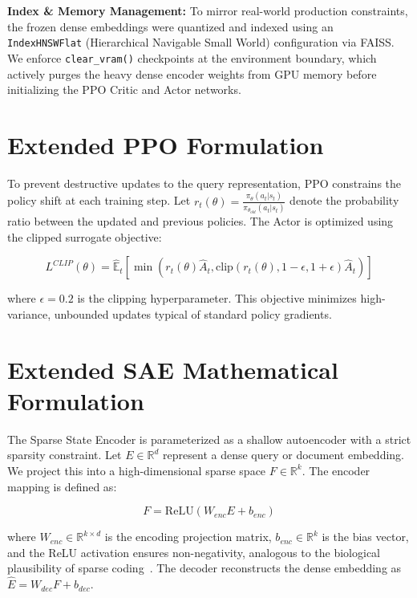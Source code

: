 \documentclass[sigconf]{acmart}
\begin{document}
\textbf{Index \& Memory Management:} To mirror real-world production constraints, the frozen dense embeddings were quantized and indexed using an \texttt{IndexHNSWFlat} (Hierarchical Navigable Small World) configuration via FAISS. We enforce \texttt{clear\_vram()} checkpoints at the environment boundary, which actively purges the heavy dense encoder weights from GPU memory before initializing the PPO Critic and Actor networks.

\section{Extended PPO Formulation}

To prevent destructive updates to the query representation, PPO constrains the policy shift at each training step. Let $r_t(\theta) = \frac{\pi_\theta(a_t|s_t)}{\pi_{\theta_{old}}(a_t|s_t)}$ denote the probability ratio between the updated and previous policies. The Actor is optimized using the clipped surrogate objective:

\begin{equation}
L^{CLIP}(\theta) = \hat{\mathbb{E}}_t \left[ \min(r_t(\theta)\hat{A}_t, \text{clip}(r_t(\theta), 1-\epsilon, 1+\epsilon)\hat{A}_t) \right]
\end{equation}

where $\epsilon = 0.2$ is the clipping hyperparameter. This objective minimizes high-variance, unbounded updates typical of standard policy gradients.

\section{Extended SAE Mathematical Formulation}

The Sparse State Encoder is parameterized as a shallow autoencoder with a strict sparsity constraint. Let $E \in \mathbb{R}^d$ represent a dense query or document embedding. We project this into a high-dimensional sparse space $F \in \mathbb{R}^k$. The encoder mapping is defined as:

\begin{equation}
F = \text{ReLU}(W_{enc}E + b_{enc})
\end{equation}

where $W_{enc} \in \mathbb{R}^{k \times d}$ is the encoding projection matrix, $b_{enc} \in \mathbb{R}^k$ is the bias vector, and the ReLU activation ensures non-negativity, analogous to the biological plausibility of sparse coding~\cite{olshausen1996, glorot2011}. The decoder reconstructs the dense embedding as $\hat{E} = W_{dec}F + b_{dec}$.
\end{document}
